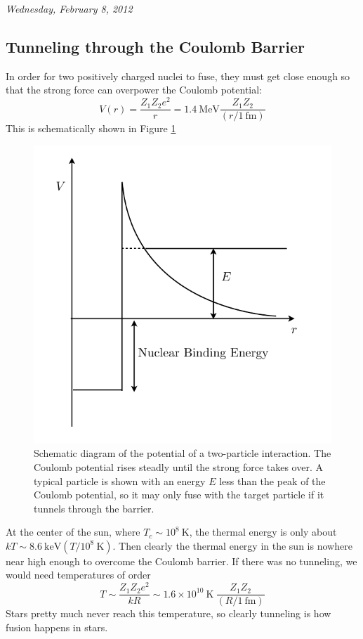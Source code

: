 \documentclass[10pt]{article}
\numberwithin{equation}{section}
\newcommand{\n}{\noindent}
\newcommand{\figref}[1]{Figure \ref{#1}}
\begin{document}
  \n\textit{Wednesday, February 8, 2012}
  \subsection{Tunneling through the Coulomb Barrier}
  \label{sec:tunn-thro-coul}

  In order for two positively charged nuclei to fuse, they must get
  close enough so that the strong force can overpower the Coulomb
  potential:
  \begin{equation}
    \label{eq:100}
    V(r)=\frac{Z_1Z_2 e^2}{r}=1.4\ \mathrm{MeV}\frac{Z_1Z_2}{(r/1\ \mathrm
{fm})}
  \end{equation}
  This is schematically shown in \figref{fig:energyPlot}
  \begin{figure}[h!]
    \centering
    \includegraphics{energyPlot.pdf}
    \caption{Schematic diagram of the potential of a two-particle
      interaction. The Coulomb potential rises steadly until the
      strong force takes over. A typical particle is
      shown with an energy $E$ less than the peak of the Coulomb
      potential, so it may only fuse with the target particle if it
      tunnels through the barrier.}
    \label{fig:energyPlot}
  \end{figure}
  At the center of the sun, where $T_c\sim 10^8\ \mathrm{K}$, the
  thermal energy is only about $kT\sim 8.6\ \mathrm{keV}\left(T/10^8\
    \mathrm{K}\right)$. Then clearly the thermal energy in the sun is
  nowhere near high enough to overcome the Coulomb barrier. If there
  was no tunneling, we would need temperatures of order 
  \begin{equation}
    \label{eq:101}
    T\sim\frac{Z_1Z_2e^2}{kR}\sim1.6\times 10^{10}\ \mathrm{K}\
    \frac{Z_1Z_2}{(R/1\ \mathrm{fm})}
  \end{equation}
  Stars pretty much never reach this temperature, so clearly tunneling
  is how fusion happens in stars.\\
\end{document}

